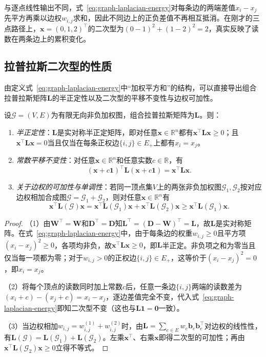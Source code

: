 与逐点线性输出不同，式~\eqref{eq:graph-laplacian-energy}对每条边的两端差值$x_i-x_j$先平方再乘以边权$w_{i,j}$求和，因此不同边上的正负差值不再相互抵消。在刚才的三点路径上，$\bm x=(0,1,2)^\top$的二次型为$(0-1)^2+(1-2)^2=2$，真实反映了读数在两条边上的累积变化。

\subsection{拉普拉斯二次型的性质}
\label{sec:graph-laplacian-quadratic-properties}

由定义式~\eqref{eq:graph-laplacian-energy}中“加权平方和”的结构，可以直接导出组合拉普拉斯矩阵$\bm L$的半正定性以及二次型的平移不变性与边权可加性。

\begin{theorem}[拉普拉斯二次型的性质与半正定性]
\label{prop:graph-laplacian-quadratic-form}
设$\mathcal G=(V,E)$为有限无向非负加权图，组合拉普拉斯矩阵为$\bm L$。则：
\begin{enumerate}
  \item \emph{半正定性}：$\bm L$是实对称半正定矩阵，即对任意$\bm x\in\mathbb R^n$都有$\bm x^\top\bm L\bm x\geq 0$；且$\bm x^\top\bm L\bm x=0$当且仅当在每条正权边$\{i,j\}\in E_+$上都有$x_i=x_j$。
  \item \emph{常数平移不变性}：对任意$\bm x\in\mathbb R^n$和任意实数$c\in\mathbb R$，有
  \[
    (\bm x+c\bm 1)^\top\bm L(\bm x+c\bm 1)=\bm x^\top\bm L\bm x.
  \]
  \item \emph{关于边权的可加性与单调性}：若同一顶点集$V$上的两张非负加权图$\mathcal G_1,\mathcal G_2$按对应边权相加合成图$\mathcal G=\mathcal G_1+\mathcal G_2$，则对任意$\bm x\in\mathbb R^n$有
  \[
    \bm x^\top\bm L(\mathcal G)\bm x
    =\bm x^\top\bm L(\mathcal G_1)\bm x+\bm x^\top\bm L(\mathcal G_2)\bm x
    \geq\bm x^\top\bm L(\mathcal G_1)\bm x.
  \]
\end{enumerate}
\end{theorem}

\begin{proof}
（1）由$\bm W^\top=\bm W$和$\bm D^\top=\bm D$知$\bm L^\top=(\bm D-\bm W)^\top=\bm L$，故$\bm L$是实对称矩阵。在式~\eqref{eq:graph-laplacian-energy}中，由于每条边的权重$w_{i,j}\geq 0$且平方项$(x_i-x_j)^2\geq 0$，各项均非负，故$\bm x^\top\bm L\bm x\geq 0$，即$\bm L$半正定。非负项之和为零当且仅当每一项都为零；对于$w_{i,j}>0$的正权边$\{i,j\}\in E_+$，这等价于$(x_i-x_j)^2=0$，即$x_i=x_j$。

（2）将每个顶点的读数同时加上常数$c$后，任意一条边$\{i,j\}$两端的读数差为$(x_i+c)-(x_j+c)=x_i-x_j$，逐边差值完全不变，代入式~\eqref{eq:graph-laplacian-energy}即知二次型不变（这也与$\bm L\bm 1=\bm 0$一致）。

（3）当边权相加$w_{i,j}=w_{i,j}^{(1)}+w_{i,j}^{(2)}$时，由$\bm L=\sum_{e\in E}w_e\bm b_e\bm b_e^\top$对边权的线性性，有$\bm L(\mathcal G)=\bm L(\mathcal G_1)+\bm L(\mathcal G_2)$。左乘$\bm x^\top$、右乘$\bm x$即得二次型的可加性；再由$\bm x^\top\bm L(\mathcal G_2)\bm x\geq 0$立得不等式。
\end{proof}

